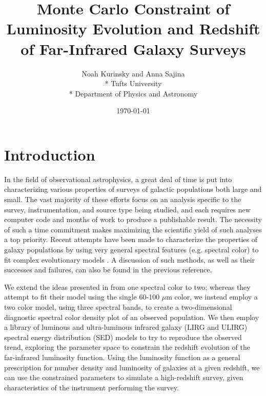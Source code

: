 \documentclass[twocolumn,letterpaper,10pt]{article}
\title{Monte Carlo Constraint of Luminosity Evolution and Redshift of Far-Infrared Galaxy Surveys}
\author{Noah Kurinsky and Anna Sajina\\*
  \small Tufts University\\*
  \small Department of Physics and Astronomy}
\date{\small \today}
\begin{document}

\section{Introduction}
In the field of observational astrophysics, a great deal of time is put into characterizing various properties of surveys of galactic populations both large and small. The vast majority of these efforts focus on an analysis specific to the survey, instrumentation, and source type being studied, and each requires new computer code and months of work to produce a publishable result. The necessity of such a time commitment makes maximizing the scientific yield of such analyses a top priority. Recent attempts have been made to characterize the properties of galaxy populations by using very general spectral features (e.g. spectral color) to fit complex evolutionary models \citep[e.g. redshift-luminosity evolution, as in ][]{marsden11}. A discussion of such methods, as well as their successes and failures, can also be found in the previous reference.

We extend the ideas presented in \citet{marsden11} from one spectral color to two; whereas they attempt to fit their model using the single 60-100 $\mu$m color, we instead employ a two color model, using three spectral bands, to create a two-dimensional diagnostic spectral color density plot of an observed population. We then employ a library of luminous and ultra-luminous infrared galaxy (LIRG and ULIRG) spectral energy distribution (SED) models to try to reproduce the observed trend, exploring the parameter space to constrain the redshift evolution of the far-infrared luminosity function. Using the luminosity function as a general prescription for number density and luminosity of galaxies at a given redshift, we can use the constrained parameters to simulate a high-redshift survey, given characteristics of the instrument performing the survey.
\end{document}
